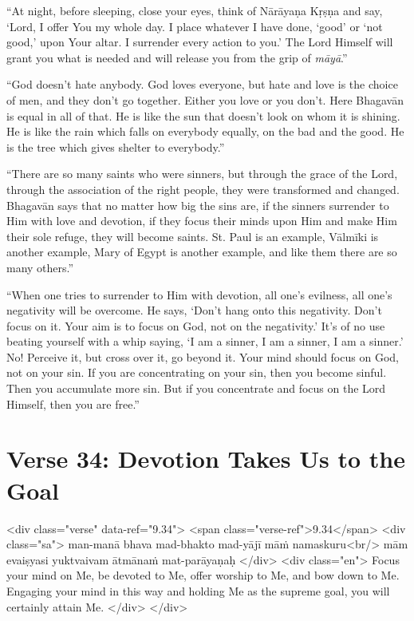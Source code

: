 \enquote{At night, before sleeping, close your eyes, think of Nārāyaṇa Kṛṣṇa and say, \enquote{Lord, I offer You my whole day. I place whatever I have done, ‘good’ or ‘not good,’ upon Your altar. I surrender every action to you.} The Lord Himself will grant you what is needed and will release you from the grip of \textit{māyā}.}

\enquote{God doesn’t hate anybody. God loves everyone, but hate and love is the choice of men, and they don’t go together. Either you love or you don’t. Here Bhagavān is equal in all of that. He is like the sun that doesn’t look on whom it is shining. He is like the rain which falls on everybody equally, on the bad and the good. He is the tree which gives shelter to everybody.}

\enquote{There are so many saints who were sinners, but through the grace of the Lord, through the association of the right people, they were transformed and changed. Bhagavān says that no matter how big the sins are, if the sinners surrender to Him with love and devotion, if they focus their minds upon Him and make Him their sole refuge, they will become saints. St. Paul is an example, Vālmīki is another example, Mary of Egypt is another example, and like them there are so many others.}

\enquote{When one tries to surrender to Him with devotion, all one’s evilness, all one’s negativity will be overcome. He says, \enquote{Don’t hang onto this negativity. Don’t focus on it. Your aim is to focus on God, not on the negativity.} It’s of no use beating yourself with a whip saying, \enquote{I am a sinner, I am a sinner, I am a sinner.} No! Perceive it, but cross over it, go beyond it. Your mind should focus on God, not on your sin. If you are concentrating on your sin, then you become sinful. Then you accumulate more sin. But if you concentrate and focus on the Lord Himself, then you are free.}



\section{Verse 34: Devotion Takes Us to the Goal}\label{sec-verse-34-devotion-takes-us-to-the-goal}




\begin{html}
<div class="verse" data-ref="9.34">
  <span class="verse-ref">9.34</span>
  <div class="sa">
    man-manā bhava mad-bhakto mad-yājī māṁ namaskuru<br/>
    mām evaiṣyasi yuktvaivam ātmānaṁ mat-parāyaṇaḥ
  </div>
  <div class="en">
    Focus your mind on Me, be devoted to Me, offer worship to Me, and bow down to Me. Engaging your mind in this way and holding Me as the supreme goal, you will certainly attain Me.
  </div>
</div>
\end{html}


